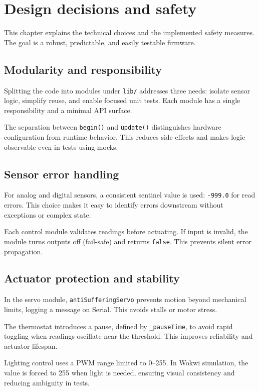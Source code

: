 \chapter{Design decisions and safety}

This chapter explains the technical choices and the implemented safety measures. The goal is a robust, predictable, and easily testable firmware.

\section{Modularity and responsibility}
Splitting the code into modules under \texttt{lib/} addresses three needs: isolate sensor logic, simplify reuse, and enable focused unit tests. Each module has a single responsibility and a minimal API surface.

The separation between \texttt{begin()} and \texttt{update()} distinguishes hardware configuration from runtime behavior. This reduces side effects and makes logic observable even in tests using mocks.

\section{Sensor error handling}
For analog and digital sensors, a consistent sentinel value is used: \texttt{-999.0} for read errors. This choice makes it easy to identify errors downstream without exceptions or complex state.

Each control module validates readings before actuating. If input is invalid, the module turns outputs off (fail-safe) and returns \texttt{false}. This prevents silent error propagation.

\section{Actuator protection and stability}
In the servo module, \texttt{antiSufferingServo} prevents motion beyond mechanical limits, logging a message on Serial. This avoids stalls or motor stress.

The thermostat introduces a pause, defined by \texttt{\_pauseTime}, to avoid rapid toggling when readings oscillate near the threshold. This improves reliability and actuator lifespan.

Lighting control uses a PWM range limited to 0--255. In Wokwi simulation, the value is forced to 255 when light is needed, ensuring visual consistency and reducing ambiguity in tests.

